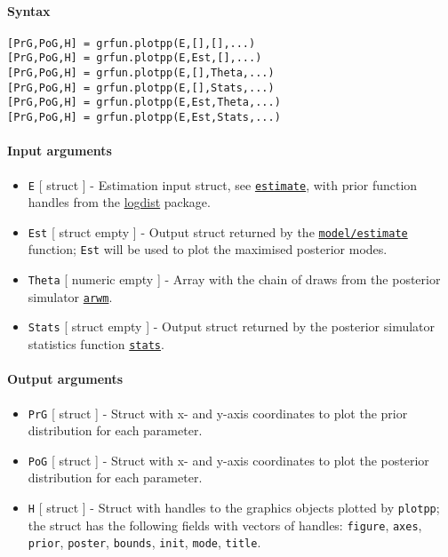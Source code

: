 


	\paragraph{Syntax}

\begin{verbatim}
[PrG,PoG,H] = grfun.plotpp(E,[],[],...)
[PrG,PoG,H] = grfun.plotpp(E,Est,[],...)
[PrG,PoG,H] = grfun.plotpp(E,[],Theta,...)
[PrG,PoG,H] = grfun.plotpp(E,[],Stats,...)
[PrG,PoG,H] = grfun.plotpp(E,Est,Theta,...)
[PrG,PoG,H] = grfun.plotpp(E,Est,Stats,...)
\end{verbatim}

\paragraph{Input arguments}

\begin{itemize}
\item
  \texttt{E} {[} struct {]} - Estimation input struct, see
  \href{model/estimate}{\texttt{estimate}}, with prior function handles
  from the \href{logdist/Contents}{logdist} package.
\item
  \texttt{Est} {[} struct \textbar{} empty {]} - Output struct returned
  by the \href{model/estimate}{\texttt{model/estimate}} function;
  \texttt{Est} will be used to plot the maximised posterior modes.
\item
  \texttt{Theta} {[} numeric \textbar{} empty {]} - Array with the chain
  of draws from the posterior simulator
  \href{poster/arwm}{\texttt{arwm}}.
\item
  \texttt{Stats} {[} struct \textbar{} empty {]} - Output struct
  returned by the posterior simulator statistics function
  \href{poster/stats}{\texttt{stats}}.
\end{itemize}

\paragraph{Output arguments}

\begin{itemize}
\item
  \texttt{PrG} {[} struct {]} - Struct with x- and y-axis coordinates to
  plot the prior distribution for each parameter.
\item
  \texttt{PoG} {[} struct {]} - Struct with x- and y-axis coordinates to
  plot the posterior distribution for each parameter.
\item
  \texttt{H} {[} struct {]} - Struct with handles to the graphics
  objects plotted by \texttt{plotpp}; the struct has the following
  fields with vectors of handles: \texttt{figure}, \texttt{axes},
  \texttt{prior}, \texttt{poster}, \texttt{bounds}, \texttt{init},
  \texttt{mode}, \texttt{title}.
\end{itemize}

